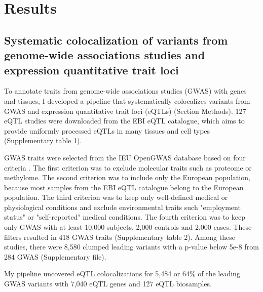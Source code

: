 \section*{Results}\label{s:results}

\subsection*{Systematic colocalization of variants from genome-wide associations studies and expression quantitative trait loci}

To annotate traits from genome-wide associations studies (GWAS) with genes and tissues,
I developed a pipeline that systematically colocalizes variants from GWAS and expression quantitative trait loci (eQTLs) (Section Methods).
%
127 eQTL studies were downloaded from the EBI eQTL catalogue, which aims to provide uniformly processed eQTLs in many
tissues and cell types \citep{2021.Alasoo.Kerimov} (Supplementary table 1).

GWAS traits were selected from the IEU OpenGWAS database based on four criteria \citep{2018.Parkinson.Buniello}.
%
The first criterion was to exclude molecular traits such as proteome or methylome.
%	
The second criterion was to include only the European population, because most
samples from the EBI eQTL catalogue belong to the European population.
%
The third criterion was to keep only well-defined medical or physiological
conditions and exclude environmental traits such "employment status" or "self-reported" medical conditions.
%
The fourth criterion was to keep only GWAS with at least 10,000 subjects, 2,000 controls and 2,000 cases.
%
These filters resulted in 418 GWAS traits (Supplementary table 2).
%
Among these studies, there were 8,580 clumped leading variants with a p-value below 5e-8 from 284 GWAS (Supplementary file).

My pipeline uncovered eQTL colocalizations for 5,484 or 64$\%$ of the leading GWAS variants with 7,040 eQTL genes and 127 eQTL biosamples.

